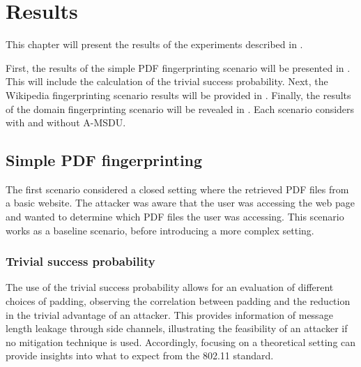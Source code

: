 \chapter{Results\label{ch:result}}

This chapter will present the results of the experiments described in .

First, the results of the simple PDF fingerprinting scenario will be presented in . This will include the calculation of the trivial success probability. Next, the Wikipedia fingerprinting scenario results will be provided in . Finally, the results of the domain fingerprinting scenario will be revealed in . Each scenario considers with and without A-MSDU.

\clearpage

\section{Simple PDF fingerprinting\label{sec:result1-result}}

\renewcommand{\arraystretch}{1.5}  %

The first scenario considered a closed setting where the retrieved PDF files from a basic website. The attacker was aware that the user was accessing the web page and wanted to determine which PDF files the user was accessing. This scenario works as a baseline scenario, before introducing a more complex setting.

\subsection{Trivial success probability}

The use of the trivial success probability allows for an evaluation of different choices of padding, observing the correlation between padding and the reduction in the trivial advantage of an attacker. This provides information of message length leakage through side channels, illustrating the feasibility of an attacker if no mitigation technique is used. Accordingly, focusing on a theoretical setting can provide insights into what to expect from the 802.11 standard. 

